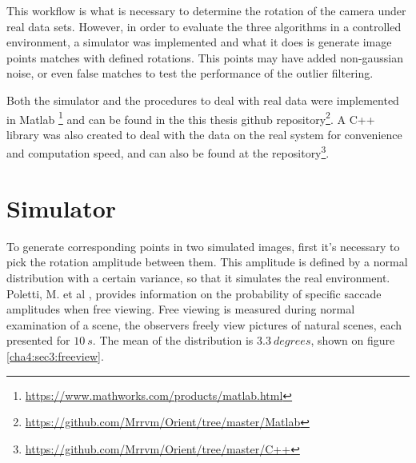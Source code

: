 This workflow is what is necessary to determine the rotation of the camera under real data sets. However, in order to evaluate the three algorithms in a controlled environment, a simulator was implemented and what it does is generate image points matches with defined rotations. This points may have added non-gaussian noise, or even false matches to test the performance of the outlier filtering. 

Both the simulator and the procedures to deal with real data were implemented in Matlab \footnote{\href{https://www.mathworks.com/products/matlab.html}{https://www.mathworks.com/products/matlab.html}} and can be found in the this thesis github repository\footnote{\href{https://github.com/Mrrvm/Orient/tree/master/Matlab}{https://github.com/Mrrvm/Orient/tree/master/Matlab}}. A C++ library was also created to deal with the data on the real system for convenience and computation speed, and can also be found at the repository\footnote{\href{https://github.com/Mrrvm/Orient/tree/master/C++}{https://github.com/Mrrvm/Orient/tree/master/C++}}.

\section{Simulator}

To generate corresponding points in two simulated images, first it's necessary to pick the rotation amplitude between them. This amplitude is defined by a normal distribution with a certain variance, so that it simulates the real environment. Poletti, M. et al \cite{saccadeamp}, provides information on the probability of specific \gls{saccade} amplitudes when free viewing. Free viewing is measured during normal examination of a scene, the observers freely view pictures of natural scenes, each presented for $10 \ s$. The mean of the distribution is $3.3 \ degrees$, shown on figure \ref{cha4:sec3:freeview}.

